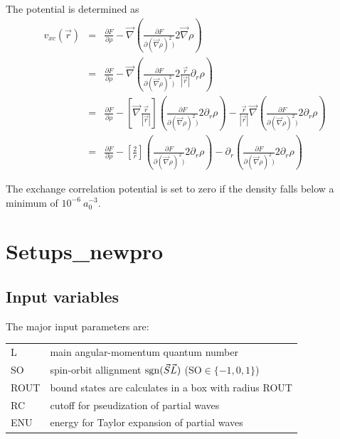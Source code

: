 \documentclass[11pt,a4paper]{report}
\begin{document}
The potential is determined as
\begin{eqnarray*}
v_{xc}(\vec{r})
&=& \frac{\partial F}{\partial\rho}
-\vec{\nabla}\left(\frac{\partial F}{\partial(\vec{\nabla}\rho)^2)}2\vec{\nabla}\rho\right)
\\
&=& \frac{\partial F}{\partial\rho}
- \vec{\nabla}\left(\frac{\partial F}{\partial(\vec{\nabla}\rho)^2)}
2\frac{\vec{r}}{|\vec{r}|}\partial_r\rho\right)
\\
&=& \frac{\partial F}{\partial\rho}
- \left[\vec{\nabla}\frac{\vec{r}}{|\vec{r}|}\right]
\left(\frac{\partial F}{\partial(\vec{\nabla}\rho)^2)}
2\partial_r\rho\right)
- \frac{\vec{r}}{|\vec{r}|}\vec{\nabla}
\left(\frac{\partial F}{\partial(\vec{\nabla}\rho)^2)}
2\partial_r\rho\right)
\\
&=& \frac{\partial F}{\partial\rho}
- \left[\frac{2}{r}\right]
\left(\frac{\partial F}{\partial(\vec{\nabla}\rho)^2)}
2\partial_r\rho\right)
- \partial_r
\left(\frac{\partial F}{\partial(\vec{\nabla}\rho)^2)}
2\partial_r\rho\right)
\end{eqnarray*}

The exchange correlation potential is set to zero if the density falls
below a minimum of $10^{-6}~a_0^{-3}$.



\section{Setups\_newpro}
\subsection{Input variables}
The major input parameters are:
\begin{center}
\begin{tabular}{|l|l|}
\hline
L    & main angular-momentum quantum number\\
SO   & spin-orbit allignment ${\rm sgn}(\vec{S}\vec{L})$ (SO$\in\{-1,0,1\}$)\\
ROUT & bound states are calculates in a box with radius ROUT\\
RC   & cutoff for pseudization of partial waves\\
ENU  & energy for Taylor expansion of partial waves\\
\hline
\end{tabular}
\end{center}
\end{document}

